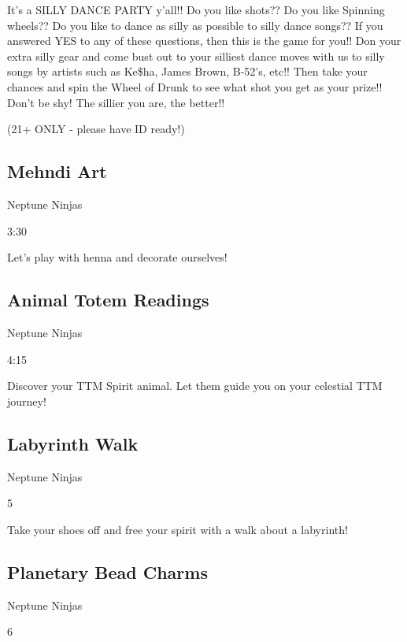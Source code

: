 \begin{multicols}{2}
It's a SILLY DANCE PARTY y'all!! Do you like shots?? Do you like Spinning wheels?? Do you like to dance as silly as possible to silly dance songs?? If you answered YES to any of these questions, then this is the game for you!! Don your extra silly gear and come bust out to your silliest dance moves with us to silly songs by artists such as Ke\$ha, James Brown, B-52's, etc!! Then take your chances and spin the Wheel of Drunk to see what shot you get as your prize!! Don't be shy! The sillier you are, the better!!  

(21+ ONLY - please have ID ready!)

\subsection*{Mehndi Art}
\begin{description}[leftmargin=6em,noitemsep,style=nextline]
	\item[Camp:] Neptune Ninjas
  \item[Times:] 3:30\pm
\end{description}

Let’s play with henna and decorate ourselves!

\subsection*{Animal Totem Readings}
\begin{description}[leftmargin=6em,noitemsep,style=nextline]
	\item[Camp:] Neptune Ninjas
  \item[Times:] 4:15\pm
\end{description}

Discover your TTM Spirit animal. Let them guide you on your celestial TTM journey!

\columnbreak
\subsection*{Labyrinth Walk}
\begin{description}[leftmargin=6em,noitemsep,style=nextline]
	\item[Camp:] Neptune Ninjas
  \item[Times:] 5\pm
\end{description}

Take your shoes off and free your spirit with a walk about a labyrinth!


\subsection*{Planetary Bead Charms}
\begin{description}[leftmargin=6em,noitemsep,style=nextline]
	\item[Camp:] Neptune Ninjas
  \item[Times:] 6\pm
\end{description}


\end{multicols}
